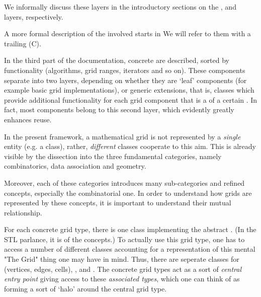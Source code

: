   
  We  informally discuss these layers in the introductory sections
  on the
  , 
 and  layers, respectively.

 A more formal description of the
  involved starts in 
 We will refer to them with a trailing (C).

 In the third part of the documentation, concrete 
 are described, sorted by functionality (algorithms, grid ranges, iterators and so on).
 These components separate into two layers, depending on whether they are `leaf' components
 (for example basic grid implementations),
 or generic extensions, that is, classes which provide additional functionality 
 for each grid component that is a  of a certain .
 In fact, most components belong to this second layer,
 which evidently greatly enhances reuse.
  
  \bigsep 

  In the present framework, a mathematical grid is not represented by a {\em single\/}
  entity (e.g. a class), 
  rather, {\em different\/} classes cooperate to this aim.
  This is already visible by the dissection into the three fundamental categories,
  namely combinatorics, data association and geometry.
  
  Moreover, each of these categories introduces many sub-categories 
  and refined concepts, 
  especially the combinatorial one.
  In order to understand how grids are represented by these concepts,
  it is important to understand their mutual relationship.

  For each concrete grid type, there is one class implementing
  the abstract .
  {\small (In the STL parlance, it is  of the concepts.)}
  To actually use this grid type, one has to access a number of
  different classes accounting for a representation 
  of this mental "The Grid" thing one may have in mind.
  Thus, there are seperate classes for 
   (vertices, edges, cells),
  , 
  and .
  The concrete grid types act as a sort of {\em central entry point\/} 
  giving access to these {\sl associated types\/},
  which one can think of  as  forming a sort of `halo'
  around the central grid type.

